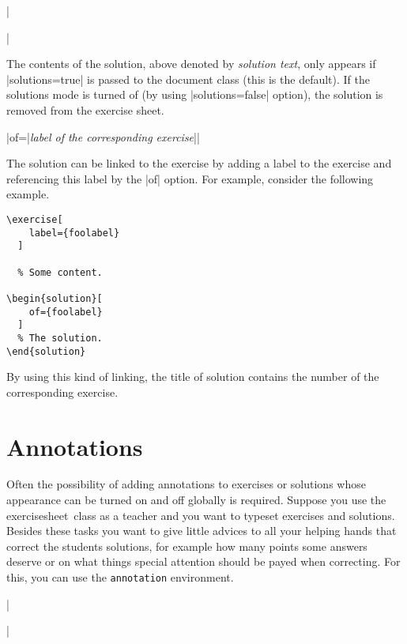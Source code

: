 \documentclass[a4paper,fleqn]{report}
\def\exercisesheet{{exercisesheet}}
\def\syntaxdefaultarg#1{\hfill\texttt{\small #1}\par\smallskip\noindent\ignorespaces}
\def\metaargument#1{\textit{\small #1}}
\begin{document}
\begin{syntax}
  ||
  \syntaxdefaultarg{}
  The contents of the solution, above denoted by
  \metaargument{solution text}, only appears if |solutions=true| is
  passed to the document class (this is the default). If the solutions
  mode is turned of (by using |solutions=false| option), the solution
  is removed from the exercise sheet.

  \begin{syntax}
    |of={|\metaargument{label of the corresponding exercise}|}| 
    \syntaxdefaultarg{}
    The solution can be linked to the exercise by adding a label to
    the exercise and referencing this label by the |of| option. For
    example, consider the following example.
    \begin{lstlisting}
\exercise[
    label={foolabel}
  ]

  % Some content.

\begin{solution}[
    of={foolabel}
  ]
  % The solution.
\end{solution}

    \end{lstlisting}
    \noindent By using this kind of linking, the title of solution
    contains the number of the corresponding exercise.
  \end{syntax}
\end{syntax}


\section{Annotations}

Often the possibility of adding annotations to exercises or solutions
whose appearance can be turned on and off globally is required.
Suppose you use the \exercisesheet\ class as a teacher and you want to
typeset exercises and solutions. Besides these tasks you want to give
little advices to all your helping hands that correct the students
solutions, for example how many points some answers deserve or on what
things special attention should be payed when correcting. For this,
you can use the \lstinline{annotation} environment.

\begin{syntax}
  ||
\end{syntax}
\end{document}
